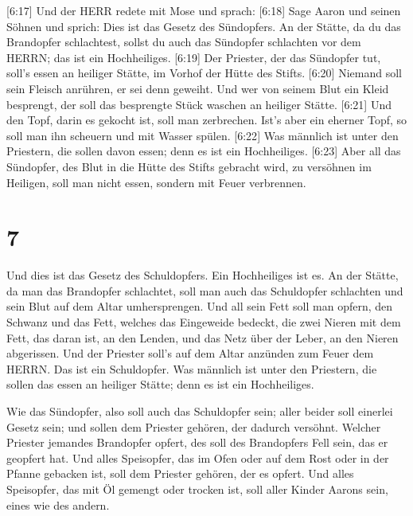  {[}6:17{]} Und der HERR redete mit Mose und sprach:
 {[}6:18{]} Sage Aaron und seinen Söhnen und sprich: Dies
ist das Gesetz des Sündopfers. An der Stätte, da du das Brandopfer
schlachtest, sollst du auch das Sündopfer schlachten vor dem HERRN; das
ist ein Hochheiliges.  {[}6:19{]} Der Priester, der das
Sündopfer tut, soll's essen an heiliger Stätte, im Vorhof der Hütte des
Stifts.  {[}6:20{]} Niemand soll sein Fleisch anrühren, er
sei denn geweiht. Und wer von seinem Blut ein Kleid besprengt, der soll
das besprengte Stück waschen an heiliger Stätte. 
{[}6:21{]} Und den Topf, darin es gekocht ist, soll man zerbrechen.
Ist's aber ein eherner Topf, so soll man ihn scheuern und mit Wasser
spülen.  {[}6:22{]} Was männlich ist unter den Priestern,
die sollen davon essen; denn es ist ein Hochheiliges. 
{[}6:23{]} Aber all das Sündopfer, des Blut in die Hütte des Stifts
gebracht wird, zu versöhnen im Heiligen, soll man nicht essen, sondern
mit Feuer verbrennen.

\hypertarget{section-6}{%
\section{7}\label{section-6}}

 Und dies ist das Gesetz des Schuldopfers. Ein Hochheiliges
ist es.  An der Stätte, da man das Brandopfer schlachtet,
soll man auch das Schuldopfer schlachten und sein Blut auf dem Altar
umhersprengen.  Und all sein Fett soll man opfern, den
Schwanz und das Fett, welches das Eingeweide bedeckt,  die
zwei Nieren mit dem Fett, das daran ist, an den Lenden, und das Netz
über der Leber, an den Nieren abgerissen.  Und der Priester
soll's auf dem Altar anzünden zum Feuer dem HERRN. Das ist ein
Schuldopfer.  Was männlich ist unter den Priestern, die
sollen das essen an heiliger Stätte; denn es ist ein Hochheiliges.

 Wie das Sündopfer, also soll auch das Schuldopfer sein;
aller beider soll einerlei Gesetz sein; und sollen dem Priester gehören,
der dadurch versöhnt.  Welcher Priester jemandes Brandopfer
opfert, des soll des Brandopfers Fell sein, das er geopfert hat.
 Und alles Speisopfer, das im Ofen oder auf dem Rost oder in
der Pfanne gebacken ist, soll dem Priester gehören, der es opfert.
 Und alles Speisopfer, das mit Öl gemengt oder trocken ist,
soll aller Kinder Aarons sein, eines wie des andern.

